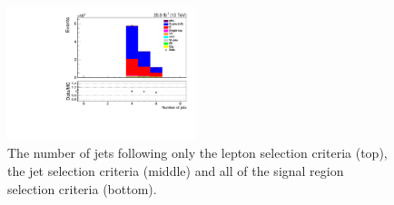 \begin{figure}[ht]
\includegraphics[width=0.49\textwidth]{figs/background-estimation/plots/unblinded/prompt_mumu_ttbarInc/numbJets_NPL_mumu_wMass_mumu.pdf}
\caption{
The number of jets following only the lepton selection criteria (top), the jet selection criteria (middle) and all of the signal region selection criteria (bottom).
}
\label{fig:App_SR_nJets}
\end{figure}

